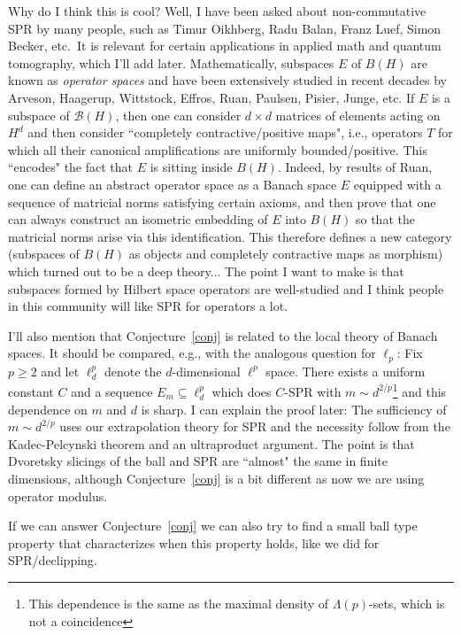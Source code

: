\documentclass[12pt,leqno]{amsart}
\numberwithin{equation}{section}
\theoremstyle{plain}
\theoremstyle{definition}
\begin{document}
Why do I think this is cool? Well, I have been asked about non-commutative SPR by many people, such as Timur Oikhberg, Radu Balan, Franz Luef, Simon Becker, etc.~It is relevant for certain applications in applied math and quantum tomography, which I'll add later. Mathematically, subspaces $E$ of $B(H)$ are known as \emph{operator spaces} and have been extensively studied in recent decades by Arveson, Haagerup, Wittstock,  Effros, Ruan, Paulsen, Pisier, Junge, etc. If $E$ is a subspace of $\mathcal{B}(H)$, then one can consider $d\times d$ matrices of elements acting on $H^d$ and then consider  ``completely contractive/positive maps", i.e.,  operators $T$ for which all their canonical amplifications are uniformly bounded/positive. This ``encodes" the fact that $E$ is sitting inside $B(H)$. Indeed, by results of Ruan, one can define an abstract operator space as a Banach space $E$ equipped with a sequence of matricial norms satisfying certain axioms, and then prove that one can always construct an isometric embedding of $E$ into $B(H)$ so that the matricial norms arise via this identification. This therefore defines a new category (subspaces of $B(H)$ as objects and completely contractive maps as morphism) which turned out to be a deep theory... The point I want to make is that subspaces formed by Hilbert space operators are well-studied and I think  people in this community will like SPR for operators a lot.
\medskip

I'll also mention that Conjecture~\ref{conj}  is related to the local theory of Banach spaces. It should be compared, e.g., with the analogous question for $\ell_p$: 
    Fix  $p\geq 2$ and let $\ell^p_d$ denote the $d$-dimensional $\ell^p$ space. There exists a uniform constant $C$ and a sequence $E_m \subseteq \ell^p_d$ which does $C$-SPR with $m\sim d^{2/p}$\footnote{This dependence is the same as the maximal density of $\Lambda(p)$-sets, which is not a coincidence} and this dependence on $m$ and $d$  is sharp. I can explain the proof later: The sufficiency of $m\sim d^{2/p}$ uses our extrapolation theory for SPR and the necessity follow from the Kadec-Pelcynski theorem and an ultraproduct argument. The point is that Dvoretsky slicings of the ball and SPR are ``almost" the same in finite dimensions, although Conjecture~\ref{conj} is a bit different as now we are using operator modulus.
    \medskip

    If we can answer Conjecture~\ref{conj}  we can also try to find a small ball type property that characterizes when this property holds, like we did for SPR/declipping.
\end{document}
